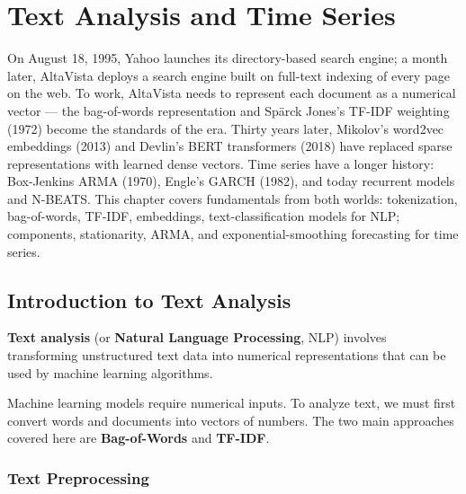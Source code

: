 \chapter{Text Analysis and Time Series}
\label{ch:text_temporal}

On August 18, 1995, Yahoo launches its directory-based search engine; a month later, AltaVista deploys a search engine built on full-text indexing of every page on the web. To work, AltaVista needs to represent each document as a numerical vector --- the bag-of-words representation and Spärck Jones's TF-IDF weighting (1972) become the standards of the era. Thirty years later, Mikolov's word2vec embeddings (2013) and Devlin's BERT transformers (2018) have replaced sparse representations with learned dense vectors. Time series have a longer history: Box-Jenkins ARMA (1970), Engle's GARCH (1982), and today recurrent models and N-BEATS. This chapter covers fundamentals from both worlds: tokenization, bag-of-words, TF-IDF, embeddings, text-classification models for NLP; components, stationarity, ARMA, and exponential-smoothing forecasting for time series.

\section{Introduction to Text Analysis}
\label{sec:intro_text}


\begin{definition}
\textbf{Text analysis} (or \textbf{Natural Language Processing}, NLP) involves transforming unstructured text data into numerical representations that can be used by machine learning algorithms.
\end{definition}

\begin{intuition}
Machine learning models require numerical inputs. To analyze text, we must first convert words and documents into vectors of numbers. The two main approaches covered here are \textbf{Bag-of-Words} and \textbf{TF-IDF}.
\end{intuition}

\subsection{Text Preprocessing}


